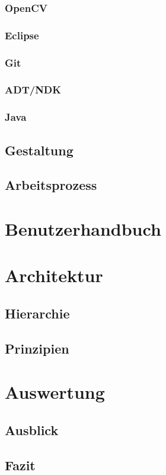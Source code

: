 \subsubsection{OpenCV}  %
\subsubsection{Eclipse}  %
\subsubsection{Git}  %
\subsubsection{ADT/NDK}  %
\subsubsection{Java}  %

\subsection{Gestaltung}  %
\subsection{Arbeitsprozess}  %

\section{Benutzerhandbuch}  %

\section{Architektur}  %
\subsection{Hierarchie}  %
\subsection{Prinzipien}  %

\section{Auswertung}  %
\subsection{Ausblick}  %
\subsection{Fazit}  %


\appendix
\printbibliography[heading=bibintoc,title={Quellenverzeichnis}]
\listoffigures


